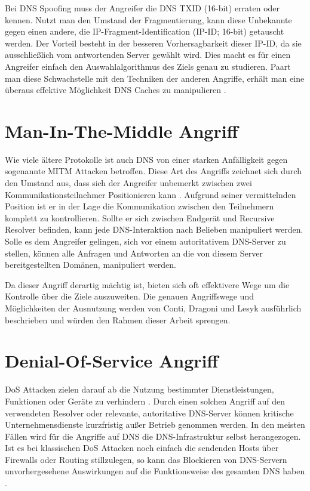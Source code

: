 Bei DNS Spoofing muss der Angreifer die DNS \ac{TXID} (16-bit) erraten oder kennen. Nutzt man den Umstand der Fragmentierung, kann diese Unbekannte gegen einen andere, die IP-Fragment-Identification (IP-ID; 16-bit) getauscht werden. Der Vorteil besteht in der besseren Vorhersagbarkeit dieser IP-ID, da sie ausschließlich vom antwortenden Server gewählt wird. Dies macht es für einen Angreifer einfach den Auswahlalgorithmus des Ziels genau zu studieren. Paart man diese Schwachstelle mit den Techniken der anderen Angriffe, erhält man eine überaus effektive Möglichkeit DNS Caches zu manipulieren \cite{Herzberg2013}.

\section{Man-In-The-Middle Angriff}
\label{sec:attack-mitm}
Wie viele ältere Protokolle ist auch DNS von einer starken Anfälligkeit gegen sogenannte \ac{MITM} Attacken betroffen. Diese Art des Angriffs zeichnet sich durch den Umstand aus, dass sich der Angreifer unbemerkt zwischen zwei Kommunikationsteilnehmer Positionieren kann \cite{CAPEC94}. Aufgrund seiner vermittelnden Position ist er in der Lage die Kommunikation zwischen den Teilnehmern komplett zu kontrollieren. Sollte er sich zwischen Endgerät und Recursive Resolver befinden, kann jede DNS-Interaktion nach Belieben manipuliert werden. Solle es dem Angreifer gelingen, sich vor einem autoritativem DNS-Server zu stellen, können alle Anfragen und Antworten an die von diesem Server bereitgestellten Domänen, manipuliert werden. 

Da dieser Angriff derartig mächtig ist, bieten sich oft effektivere Wege um die Kontrolle über die Ziele auszuweiten. Die genauen Angriffswege und Möglichkeiten der Ausnutzung werden von Conti, Dragoni und Lesyk \cite{Conti2016} ausführlich beschrieben und würden den Rahmen dieser Arbeit sprengen.

\section{Denial-Of-Service Angriff}
\label{sec:attacks-dos}
\ac{DoS} Attacken  zielen darauf ab die Nutzung bestimmter Dienstleistungen, Funktionen oder Geräte zu verhindern \cite{BSIG040}. Durch einen solchen Angriff auf den verwendeten Resolver oder relevante, autoritative DNS-Server können kritische Unternehmensdienste kurzfristig außer Betrieb genommen werden. In den meisten Fällen wird für die Angriffe auf DNS die DNS-Infrastruktur selbst herangezogen. Ist es bei klassischen \ac{DoS} Attacken noch einfach die sendenden Hosts über Firewalls oder Routing stillzulegen, so kann das Blockieren von DNS-Servern unvorhergesehene Auswirkungen auf die Funktionsweise des gesamten DNS haben \cite{Kambourakis2008}. 

